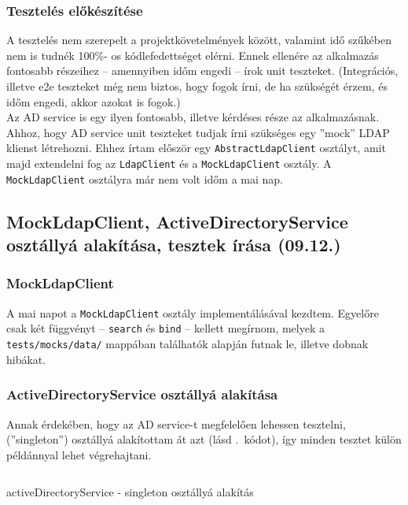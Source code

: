 \documentclass[a4paper]{article}
\newcommand{\inlts}[1]{\texttt{#1}}
\begin{document}
\subsubsection*{Tesztelés előkészítése}
A tesztelés nem szerepelt a projektkövetelmények között, valamint idő szűkében nem is tudnék 100\%-
os kódlefedettséget elérni. Ennek ellenére az alkalmazás fontosabb részeihez – amennyiben időm
engedi – írok unit teszteket. (Integrációs, illetve e2e teszteket még nem biztos, hogy fogok írni, de ha
szükségét érzem, és időm engedi, akkor azokat is fogok.) \\

Az AD service is egy ilyen fontosabb, illetve kérdéses része az alkalmazásnak. Ahhoz, hogy AD service
unit teszteket tudjak írni szükséges egy ”mock” LDAP klienst létrehozni. Ehhez írtam először egy
\inlts{AbstractLdapClient} osztályt, amit majd extendelni fog az \inlts{LdapClient} és a \inlts{MockLdapClient}
osztály. A \inlts{MockLdapClient} osztályra már nem volt időm a mai nap.

\subsection{MockLdapClient, ActiveDirectoryService osztállyá alakítása, tesztek
írása (09.12.)}

\subsubsection*{MockLdapClient}

A mai napot a \inlts{MockLdapClient} osztály implementálásával kezdtem. Egyelőre csak két függvényt –
\inlts{search} és \inlts{bind} – kellett megírnom, melyek a \inlts{tests/mocks/data/} mappában találhatók alapján
futnak le, illetve dobnak hibákat.

\subsubsection*{ActiveDirectoryService osztállyá alakítása}

Annak érdekében, hogy az AD service-t megfelelően lehessen tesztelni, (”singleton”) osztállyá
alakítottam át azt (lásd .~kódot), így minden tesztet külön példánnyal lehet végrehajtani.

\begin{listing}[!ht]
\inputminted[bgcolor=codebg, breaklines, breakanywhere, fontsize=\small]{typescript}{code/activeDirectoryServiceSingleton.ts}
\caption{activeDirectoryService - singleton osztállyá alakítás}
\label{listing:active_directory_service_singleton}
\end{listing}
\end{document}
